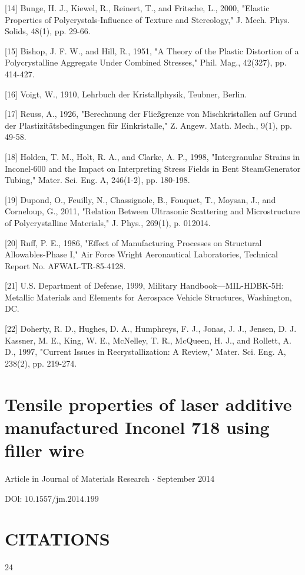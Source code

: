 \documentclass[10pt]{article}
\begin{document}
[14] Bunge, H. J., Kiewel, R., Reinert, T., and Fritsche, L., 2000, "Elastic Properties of Polycrystals-Influence of Texture and Stereology," J. Mech. Phys. Solids, 48(1), pp. 29-66.

[15] Bishop, J. F. W., and Hill, R., 1951, "A Theory of the Plastic Distortion of a Polycrystalline Aggregate Under Combined Stresses," Phil. Mag., 42(327), pp. 414-427.

[16] Voigt, W., 1910, Lehrbuch der Kristallphysik, Teubner, Berlin.

[17] Reuss, A., 1926, "Berechnung der Fließgrenze von Mischkristallen auf Grund der Plastizitätsbedingungen für Einkristalle," Z. Angew. Math. Mech., 9(1), pp. 49-58.

[18] Holden, T. M., Holt, R. A., and Clarke, A. P., 1998, "Intergranular Strains in Inconel-600 and the Impact on Interpreting Stress Fields in Bent SteamGenerator Tubing," Mater. Sci. Eng. A, 246(1-2), pp. 180-198.

[19] Dupond, O., Feuilly, N., Chassignole, B., Fouquet, T., Moysan, J., and Corneloup, G., 2011, "Relation Between Ultrasonic Scattering and Microstructure of Polycrystalline Materials," J. Phys., 269(1), p. 012014.

[20] Ruff, P. E., 1986, "Effect of Manufacturing Processes on Structural Allowables-Phase I," Air Force Wright Aeronautical Laboratories, Technical Report No. AFWAL-TR-85-4128.

[21] U.S. Department of Defense, 1999, Military Handbook—MIL-HDBK-5H: Metallic Materials and Elements for Aerospace Vehicle Structures, Washington, DC.

[22] Doherty, R. D., Hughes, D. A., Humphreys, F. J., Jonas, J. J., Jensen, D. J. Kassner, M. E., King, W. E., McNelley, T. R., McQueen, H. J., and Rollett, A. D., 1997, "Current Issues in Recrystallization: A Review," Mater. Sci. Eng. A, 238(2), pp. 219-274.

\section*{Tensile properties of laser additive manufactured Inconel 718 using filler wire}
Article in Journal of Materials Research $\cdot$ September 2014

DOl: $10.1557 / \mathrm{jm} .2014 .199$

\section*{CITATIONS}
24
\end{document}
